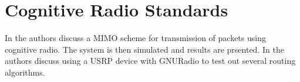 \section{Cognitive Radio Standards}
In \cite{7124942} the authors discuss a MIMO scheme for transmission of packets using cognitive radio. The system is then simulated and results are prsented. In \cite{5784217} the authors discuss using a
USRP device with GNURadio to test out several routing algorithms.  
